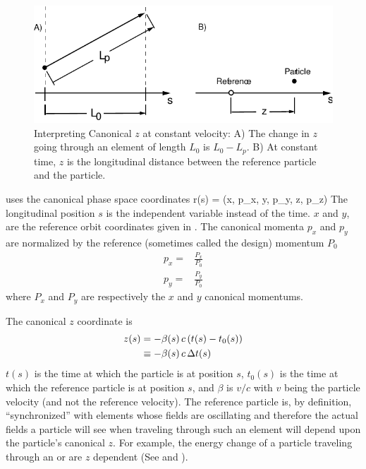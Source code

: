 \begin{figure}
\centering 
\includegraphics{canonical-z.pdf} 
\caption[Interpreting Canonical $z$ at constant velocity.]
{Interpreting Canonical $z$ at constant velocity: A) The change in $z$
going through an element of length $L_0$ is $L_0 - L_p$.  B) At
constant time, $z$ is the longitudinal distance between the reference
particle and the particle.}
\label{f:canonical.z}
\end{figure}

\bmad uses the canonical phase space coordinates 
\Begineq
  \Bf r(s) = (x, p_x, y, p_y, z, p_z)
\Endeq
The longitudinal position $s$ is the independent variable instead of
the time.  $x$ and $y$, are the reference orbit coordinates given in
.  The canonical momenta $p_x$ and $p_y$ are
normalized by the reference (sometimes called the
design) momentum $P_0$
\begin{align}
  p_x = &\frac{P_x}{P_0} \\
  p_y = &\frac{P_y}{P_0}
\end{align}
where $P_x$ and $P_y$ are respectively the $x$ and $y$ canonical momentums.

The canonical $z$ coordinate is 
\begin{align}
  z(s) &= -\beta(s) \, c \, (t(s) - t_0(s)) \nonumber \\
    &\equiv - \beta(s) \, c \, \Delta t(s)
  \label{zbctt}
\end{align}
$t(s)$ is the time at which the particle is at position $s$, $t_0(s)$
is the time at which the reference particle is at position $s$, and
$\beta$ is $v/c$ with $v$ being the particle velocity (and not the
reference velocity). The reference particle is, by definition,
``synchronized'' with elements whose fields are oscillating and therefore the
actual fields a particle will see when traveling through such an
element will depend upon the particle's canonical $z$. For example,
the energy change of a particle traveling through an  or
 are $z$ dependent (See  and ).

